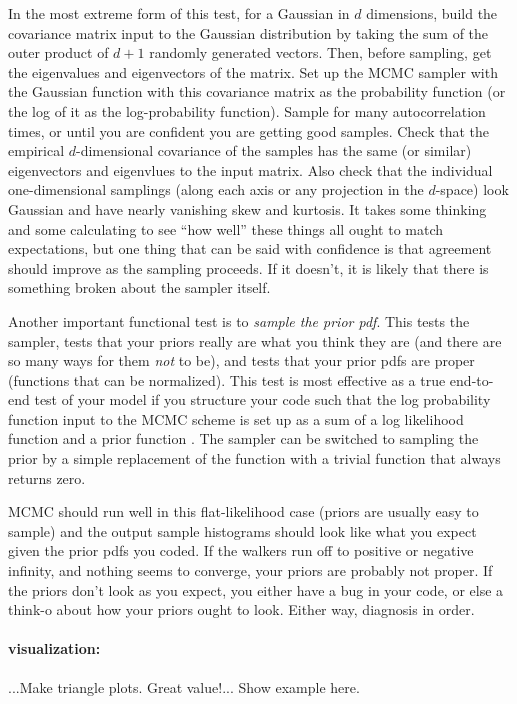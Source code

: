\documentclass[12pt,twoside,pdftex]{article}
\begin{document}
In the most extreme form of this test,
  for a Gaussian in $d$ dimensions,
  build the covariance matrix input to the Gaussian distribution
  by taking the sum of the outer product of $d+1$ randomly generated vectors.
Then, before sampling, get the eigenvalues and eigenvectors of the matrix.
Set up the MCMC sampler with the Gaussian function with this covariance matrix
  as the probability function (or the log of it as the log-probability function).
Sample for many autocorrelation times,
  or until you are confident you are getting good samples.
Check that the empirical $d$-dimensional covariance of the samples
  has the same (or similar) eigenvectors and eigenvlues to the input matrix.
Also check that the individual one-dimensional samplings
  (along each axis or any projection in the $d$-space)
  look Gaussian and have nearly vanishing skew and kurtosis.
It takes some thinking and some calculating to see ``how well'' these things all ought to match
  expectations, but one thing that can be said with confidence is that agreement should improve
  as the sampling proceeds.
If it doesn't, it is likely that there is something broken about the sampler itself.

Another important functional test is to \emph{sample the prior pdf}.
This tests the sampler,
  tests that your priors really are what you think they are
  (and there are so many ways for them \emph{not} to be),
  and tests that your prior pdfs are proper
  (functions that can be normalized).
This test is most effective as a true end-to-end test of your model
  if you structure your code such that the log probability function 
  input to the MCMC scheme
  is set up as a sum of a log likelihood function 
  and a prior function .
The sampler can be switched to sampling the prior by a simple replacement
  of the  function
  with a trivial function that always returns zero.

MCMC should run well in this flat-likelihood case (priors are usually easy to sample)
  and the output sample histograms should look like what you expect
  given the prior pdfs you coded.
If the walkers run off to positive or negative infinity,
  and nothing seems to converge,
  your priors are probably not proper.
If the priors don't look as you expect,
  you either have a bug in your code,
  or else a think-o about how your priors ought to look.
Either way, diagnosis in order.

\paragraph{visualization:}
...Make triangle plots.  Great value!...  Show example here.
\end{document}
